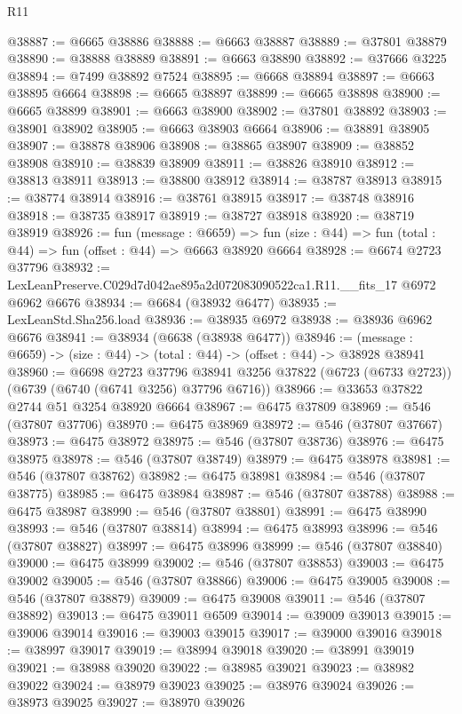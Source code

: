 \begin{lexlean}{R11}
\begin{coremodule}
@38887 := @6665 @38886
@38888 := @6663 @38887
@38889 := @37801 @38879
@38890 := @38888 @38889
@38891 := @6663 @38890
@38892 := @37666 @3225
@38894 := @7499 @38892 @7524
@38895 := @6668 @38894
@38897 := @6663 @38895 @6664
@38898 := @6665 @38897
@38899 := @6665 @38898
@38900 := @6665 @38899
@38901 := @6663 @38900
@38902 := @37801 @38892
@38903 := @38901 @38902
@38905 := @6663 @38903 @6664
@38906 := @38891 @38905
@38907 := @38878 @38906
@38908 := @38865 @38907
@38909 := @38852 @38908
@38910 := @38839 @38909
@38911 := @38826 @38910
@38912 := @38813 @38911
@38913 := @38800 @38912
@38914 := @38787 @38913
@38915 := @38774 @38914
@38916 := @38761 @38915
@38917 := @38748 @38916
@38918 := @38735 @38917
@38919 := @38727 @38918
@38920 := @38719 @38919
@38926 := fun (message : @6659) =>
  fun (size : @44) => fun (total : @44) => fun (offset : @44) => @6663 @38920 @6664
@38928 := @6674 @2723 @37796
@38932 := LexLeanPreserve.C029d7d042ae895a2d072083090522ca1.R11.__fits_17 @6972 @6962 @6676
@38934 := @6684 (@38932 @6477)
@38935 := LexLeanStd.Sha256.load
@38936 := @38935 @6972
@38938 := @38936 @6962 @6676
@38941 := @38934 (@6638 (@38938 @6477))
@38946 := (message : @6659) -> (size : @44) -> (total : @44) -> (offset : @44) -> @38928 @38941
@38960 := @6698
    @2723
    @37796
    @38941
    @3256
    @37822
    (@6723 (@6733 @2723))
    (@6739 (@6740 (@6741 @3256) @37796 @6716))
@38966 := @33653 @37822 @2744 @51 @3254 @38920 @6664
@38967 := @6475 @37809
@38969 := @546 (@37807 @37706)
@38970 := @6475 @38969
@38972 := @546 (@37807 @37667)
@38973 := @6475 @38972
@38975 := @546 (@37807 @38736)
@38976 := @6475 @38975
@38978 := @546 (@37807 @38749)
@38979 := @6475 @38978
@38981 := @546 (@37807 @38762)
@38982 := @6475 @38981
@38984 := @546 (@37807 @38775)
@38985 := @6475 @38984
@38987 := @546 (@37807 @38788)
@38988 := @6475 @38987
@38990 := @546 (@37807 @38801)
@38991 := @6475 @38990
@38993 := @546 (@37807 @38814)
@38994 := @6475 @38993
@38996 := @546 (@37807 @38827)
@38997 := @6475 @38996
@38999 := @546 (@37807 @38840)
@39000 := @6475 @38999
@39002 := @546 (@37807 @38853)
@39003 := @6475 @39002
@39005 := @546 (@37807 @38866)
@39006 := @6475 @39005
@39008 := @546 (@37807 @38879)
@39009 := @6475 @39008
@39011 := @546 (@37807 @38892)
@39013 := @6475 @39011 @6509
@39014 := @39009 @39013
@39015 := @39006 @39014
@39016 := @39003 @39015
@39017 := @39000 @39016
@39018 := @38997 @39017
@39019 := @38994 @39018
@39020 := @38991 @39019
@39021 := @38988 @39020
@39022 := @38985 @39021
@39023 := @38982 @39022
@39024 := @38979 @39023
@39025 := @38976 @39024
@39026 := @38973 @39025
@39027 := @38970 @39026

\end{coremodule}
\end{lexlean}
